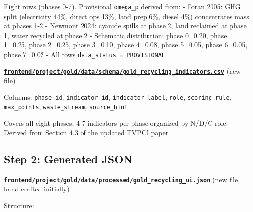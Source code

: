 \documentclass[
  11pt,
]{article}
\begin{document}
Eight rows (phases 0-7). Provisional \texttt{omega\_p} derived from: -
Foran 2005: GHG split (electricity 44\%, direct ops 13\%, land prep 6\%,
diesel 4\%) concentrates mass at phases 1-2 - Newmont 2024: cyanide
spills at phase 2, land reclaimed at phase 1, water recycled at phase 2
- Schematic distribution: phase 0=0.20, phase 1=0.25, phase 2=0.25,
phase 3=0.10, phase 4=0.08, phase 5=0.05, phase 6=0.05, phase 7=0.02 -
All rows \texttt{data\_status\ =\ PROVISIONAL}

\textbf{\href{frontend/project/gold/data/schema/gold_recycling_indicators.csv}{\texttt{frontend/project/gold/data/schema/gold\_recycling\_indicators.csv}}}
(new file)

Columns: \texttt{phase\_id}, \texttt{indicator\_id},
\texttt{indicator\_label}, \texttt{role}, \texttt{scoring\_rule},
\texttt{max\_points}, \texttt{waste\_stream}, \texttt{source\_hint}

Covers all eight phases; 4-7 indicators per phase organized by N/D/C
role. Derived from Section 4.3 of the updated TVPCI paper.

\subsection{Step 2: Generated JSON}\label{step-2-generated-json}

\textbf{\href{frontend/project/gold/data/processed/gold_recycling_ui.json}{\texttt{frontend/project/gold/data/processed/gold\_recycling\_ui.json}}}
(new file, hand-crafted initially)

Structure:
\end{document}
